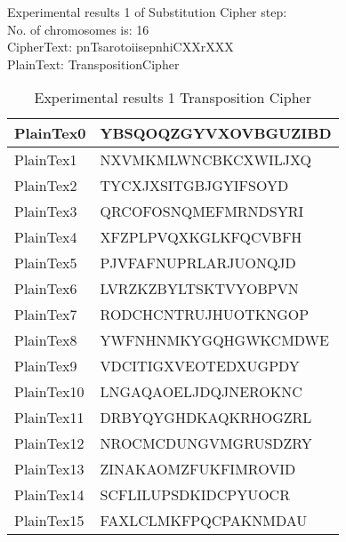 \begin{tcolorbox}[breakable,notitle,boxrule=0pt,colback=blue!20,colframe=blue!20]
    {
    \textsf{Experimental results 1 of Substitution Cipher step:}\\
    \textsf{     No. of chromosomes is: 16}\\
    \textsf{     CipherText: pnTsarotoiisepnhiCXXrXXX}\\
    \textsf{     PlainText: TranspositionCipher}
    }
    \end{tcolorbox}
\begin{table}[H]
\centering
\begin{tabular}{l l}\hline
    PlainTex0 &YBSQOQZGYVXOVBGUZIBD\\ \hline
PlainTex1 &NXVMKMLWNCBKCXWILJXQ\\ \hline
PlainTex2 &TYCXJXSITGBJGYIFSOYD\\ \hline
PlainTex3 &QRCOFOSNQMEFMRNDSYRI\\ \hline
PlainTex4 &XFZPLPVQXKGLKFQCVBFH\\ \hline
PlainTex5 &PJVFAFNUPRLARJUONQJD\\ \hline
PlainTex6 &LVRZKZBYLTSKTVYOBPVN\\ \hline
PlainTex7 &RODCHCNTRUJHUOTKNGOP\\ \hline
PlainTex8 &YWFNHNMKYGQHGWKCMDWE\\ \hline
PlainTex9 &VDCITIGXVEOTEDXUGPDY\\ \hline
PlainTex10 &LNGAQAOELJDQJNEROKNC\\ \hline
PlainTex11 &DRBYQYGHDKAQKRHOGZRL\\ \hline
PlainTex12 &NROCMCDUNGVMGRUSDZRY\\ \hline
PlainTex13 &ZINAKAOMZFUKFIMROVID\\ \hline
PlainTex14 &SCFLILUPSDKIDCPYUOCR\\ \hline
PlainTex15 &FAXLCLMKFPQCPAKNMDAU\\ \hline
\end{tabular}
\caption{Experimental results 1 Transposition Cipher}

\end{table}


